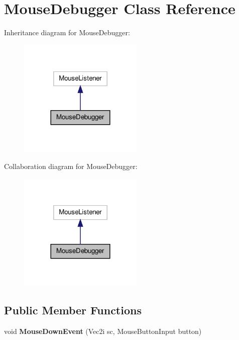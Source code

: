 \hypertarget{class_mouse_debugger}{\section{Mouse\-Debugger Class Reference}
\label{class_mouse_debugger}
}


Inheritance diagram for Mouse\-Debugger\-:\nopagebreak
\begin{figure}[H]
\begin{center}
\leavevmode
\includegraphics[width=168pt]{class_mouse_debugger__inherit__graph}
\end{center}
\end{figure}


Collaboration diagram for Mouse\-Debugger\-:\nopagebreak
\begin{figure}[H]
\begin{center}
\leavevmode
\includegraphics[width=168pt]{class_mouse_debugger__coll__graph}
\end{center}
\end{figure}
\subsection*{Public Member Functions}
\begin{DoxyCompactItemize}
\item 
\hypertarget{class_mouse_debugger_a0d7f7e10a54cd1fc98370467805b24ac}{void {\bfseries Mouse\-Down\-Event} (Vec2i sc, Mouse\-Button\-Input button)}\label{class_mouse_debugger_a0d7f7e10a54cd1fc98370467805b24ac}

\end{DoxyCompactItemize}


